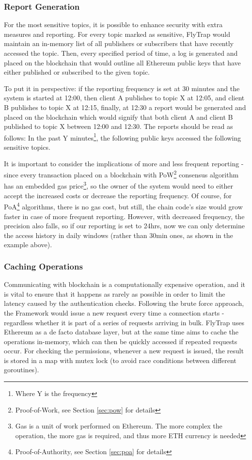 \subsubsection{Report Generation}\label{sec:reports}
For the most sensitive topics, it is possible to enhance security with extra measures and reporting. For every topic marked as sensitive, FlyTrap would maintain an in-memory list of all publishers or subscribers that have recently accessed the topic. Then, every specified period of time, a log is generated and placed on the blockchain that would outline all Ethereum public keys that have either published or subscribed to the given topic.

To put it in perspective: if the reporting frequency is set at 30 minutes and the system is started at 12:00, then client A publishes to topic  X at 12:05, and client B publishes to topic X at 12:15, finally, at 12:30 a report would be generated and placed on the blockchain which would signify that both client A and client B published to topic X between 12:00 and 12:30. The reports should be read as follows: In the past Y minutes\footnote{Where Y is the frequency}, the following public keys accessed the following sensitive topics. 

It is important to consider the implications of more and less frequent reporting - since every transaction placed on a blockchain with PoW\footnote{Proof-of-Work, see Section \ref{sec:pow} for details} consensus algorithm has an embedded gas price\footnote{Gas is a unit of work performed on Ethereum. The more complex the operation, the more gas is required, and thus more ETH currency is needed}, so the owner of the system would need to either accept the increased costs or decrease the reporting frequency. Of course, for PoA\footnote{Proof-of-Authority, see Section \ref{sec:poa} for details} algorithms, there is no gas cost, but still, the chain code's size would grow faster in case of more frequent reporting. However, with decreased frequency, the precision also falls, so if our reporting is set to 24hrs, now we can only determine the access history in daily windows (rather than 30min ones, as shown in the example above).
\subsubsection{Caching Operations}
Communicating with blockchain is a computationally expensive operation, and it is vital to ensure that it happens as rarely as possible in order to limit the latency caused by the authentication checks. Following the brute force approach, the Framework would issue a new request every time a connection starts - regardless whether it is part of a series of requests arriving in bulk. FlyTrap uses Ethereum as a de facto database layer, but at the same time aims to cache the operations in-memory, which can then be quickly accessed if repeated requests occur. For checking the permissions, whenever a new request is issued, the result is stored in a map with mutex lock (to avoid race conditions between different goroutines).

